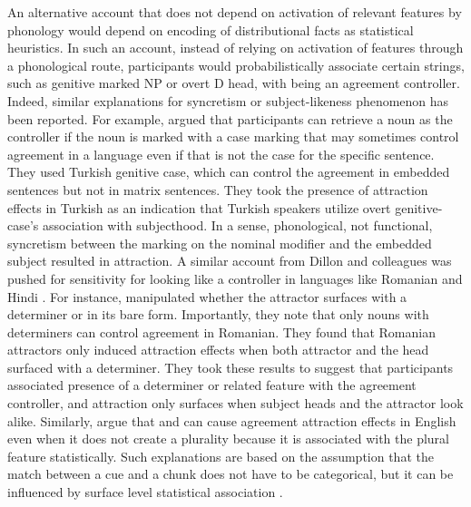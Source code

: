 \documentclass[
  authoryear,
  3p]{elsarticle}
\begin{document}
An alternative account that does not depend on activation of relevant
features by phonology would depend on encoding of distributional facts
as statistical heuristics. In such an account, instead of relying on
activation of features through a phonological route, participants would
probabilistically associate certain strings, such as genitive marked NP
or overt D head, with being an agreement controller. Indeed, similar
explanations for syncretism or subject-likeness phenomenon has been
reported. For example, \citet{LagoEtAl2019} argued that participants can
retrieve a noun as the controller if the noun is marked with a case
marking that may sometimes control agreement in a language even if that
is not the case for the specific sentence. They used Turkish genitive
case, which can control the agreement in embedded sentences but not in
matrix sentences. They took the presence of attraction effects in
Turkish as an indication that Turkish speakers utilize overt
genitive-case's association with subjecthood. In a sense, phonological,
not functional, syncretism between the marking on the nominal modifier
and the embedded subject resulted in attraction. A similar account from
Dillon and colleagues was pushed for sensitivity for looking like a
controller in languages like Romanian and Hindi
\citep{BhatiaDillon2022, BleotuDillon2024}. For instance,
\citet{BleotuDillon2024} manipulated whether the attractor surfaces with
a determiner or in its bare form. Importantly, they note that only nouns
with determiners can control agreement in Romanian. They found that
Romanian attractors only induced attraction effects when both attractor
and the head surfaced with a determiner. They took these results to
suggest that participants associated presence of a determiner or related
feature with the agreement controller, and attraction only surfaces when
subject heads and the attractor look alike. Similarly,
\citet{SchlueterEtAl2018} argue that and can cause agreement attraction
effects in English even when it does not create a plurality because it
is associated with the plural feature statistically. Such explanations
are based on the assumption that the match between a cue and a chunk
does not have to be categorical, but it can be influenced by surface
level statistical association \citep{EngelmannEtAl2019}.
\end{document}
